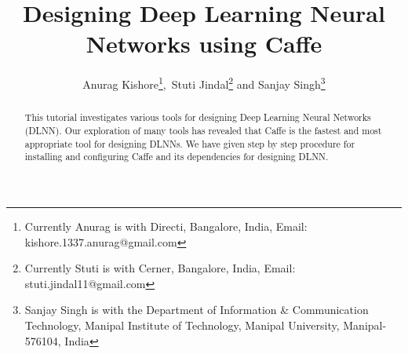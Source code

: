 \documentclass{article}
\begin{document}
\title{Designing Deep Learning Neural Networks using Caffe}
\author{Anurag Kishore\thanks{Currently Anurag is with Directi, Bangalore, India, Email: kishore.1337.anurag@gmail.com},~Stuti Jindal\thanks{Currently Stuti is with Cerner, Bangalore, India, Email: stuti.jindal11@gmail.com} and Sanjay Singh\thanks{Sanjay Singh is with the Department of Information \& Communication Technology, Manipal Institute of Technology, Manipal University, Manipal-576104, India}}

\maketitle

\begin{abstract}
This tutorial investigates various tools for designing Deep Learning Neural Networks (DLNN). Our exploration of many tools has revealed that Caffe is the fastest and most appropriate tool for designing DLNNs. We have given step by step procedure for installing and configuring Caffe and its dependencies for designing DLNN. 
\end{abstract}
	
\end{document}
